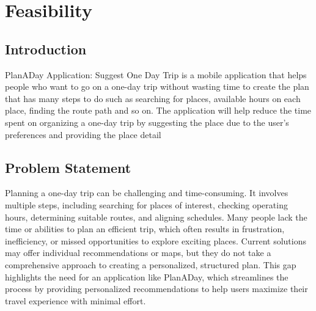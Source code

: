 \chapter{Feasibility}
\section{Introduction}

\par
PlanADay Application: Suggest One Day Trip is a mobile application that helps people who
want to go on a one-day trip without wasting time to create the plan that has many steps to do
such as searching for places, available hours on each place, finding the route path and so on. The
application will help reduce the time spent on organizing a one-day trip by suggesting the place
due to the user’s preferences and providing the place detail
\section{Problem Statement}
\par
Planning a one-day trip can be challenging and time-consuming. It involves multiple steps,
including searching for places of interest, checking operating hours, determining suitable routes,
and aligning schedules. Many people lack the time or abilities to plan an efficient trip, which
often results in frustration, inefficiency, or missed opportunities to explore exciting places.
Current solutions may offer individual recommendations or maps, but they do not take a
comprehensive approach to creating a personalized, structured plan. This gap highlights the need
for an application like PlanADay, which streamlines the process by providing personalized
recommendations to help users maximize their travel experience with minimal effort.
